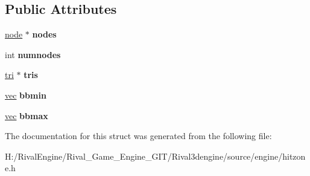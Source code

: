 \subsection*{Public Attributes}
\begin{DoxyCompactItemize}
\item 
\mbox{\label{structskelbih_a9eb99d4d5c871af4071be5edb207a5fc}} 
\hyperlink{structskelbih_1_1node}{node} $\ast$ {\bfseries nodes}
\item 
\mbox{\label{structskelbih_a6b446b17e57b33e1e1c84a49bad7e692}} 
int {\bfseries numnodes}
\item 
\mbox{\label{structskelbih_a8e0f514b44d72569f9320c52f66d0f43}} 
\hyperlink{structskelbih_1_1tri}{tri} $\ast$ {\bfseries tris}
\item 
\mbox{\label{structskelbih_abea7b1a10c9fadc0e7cce490a4f6e379}} 
\hyperlink{structvec}{vec} {\bfseries bbmin}
\item 
\mbox{\label{structskelbih_a7d357546f07e772df295811edc6d4957}} 
\hyperlink{structvec}{vec} {\bfseries bbmax}
\end{DoxyCompactItemize}


The documentation for this struct was generated from the following file\+:\begin{DoxyCompactItemize}
\item 
H\+:/\+Rival\+Engine/\+Rival\+\_\+\+Game\+\_\+\+Engine\+\_\+\+G\+I\+T/\+Rival3dengine/source/engine/hitzone.\+h\end{DoxyCompactItemize}
